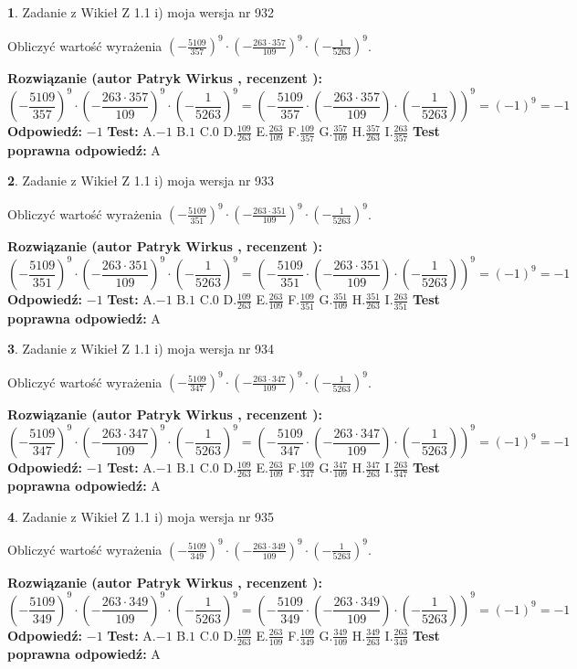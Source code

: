 \documentclass[12pt, a4paper]{article}
\theoremstyle{definition} %
\newtheorem{zad}{}
\newcommand{\zadStart}[1]{\begin{zad}#1\newline}
\newcommand{\zadStop}{\end{zad}}
\newcommand{\rozwStart}[2]{\noindent \textbf{Rozwiązanie (autor #1 , recenzent #2): }\newline}
\newcommand{\rozwStop}{\newline}
\newcommand{\odpStart}{\noindent \textbf{Odpowiedź:}\newline}
\newcommand{\odpStop}{\newline}
\newcommand{\testStart}{\noindent \textbf{Test:}\newline}
\newcommand{\testStop}{\newline}
\newcommand{\kluczStart}{\noindent \textbf{Test poprawna odpowiedź:}\newline}
\newcommand{\kluczStop}{\newline}
\begin{document}
\zadStart{Zadanie z Wikieł Z 1.1 i) moja wersja nr 932}

Obliczyć wartość wyrażenia $(-\frac{5109}{357})^{9} \cdot (-\frac{263 \cdot 357}{109})^{9} \cdot (-\frac{1}{5263})^{9}$.
\zadStop
\rozwStart{Patryk Wirkus}{}
$$(-\frac{5109}{357})^{9} \cdot (-\frac{263 \cdot 357}{109})^{9} \cdot (-\frac{1}{5263})^{9} = (-\frac{5109}{357} \cdot (-\frac{263 \cdot 357}{109}) \cdot (-\frac{1}{5263}))^{9} = (-1)^{9} = -1$$
\rozwStop
\odpStart
$-1$
\odpStop
\testStart
A.$-1$ B.$1$ C.$0$ D.$\frac{109}{263}$ E.$\frac{263}{109}$
F.$\frac{109}{357}$ G.$\frac{357}{109}$
H.$\frac{357}{263}$
I.$\frac{263}{357}$
\testStop
\kluczStart
A
\kluczStop



\zadStart{Zadanie z Wikieł Z 1.1 i) moja wersja nr 933}

Obliczyć wartość wyrażenia $(-\frac{5109}{351})^{9} \cdot (-\frac{263 \cdot 351}{109})^{9} \cdot (-\frac{1}{5263})^{9}$.
\zadStop
\rozwStart{Patryk Wirkus}{}
$$(-\frac{5109}{351})^{9} \cdot (-\frac{263 \cdot 351}{109})^{9} \cdot (-\frac{1}{5263})^{9} = (-\frac{5109}{351} \cdot (-\frac{263 \cdot 351}{109}) \cdot (-\frac{1}{5263}))^{9} = (-1)^{9} = -1$$
\rozwStop
\odpStart
$-1$
\odpStop
\testStart
A.$-1$ B.$1$ C.$0$ D.$\frac{109}{263}$ E.$\frac{263}{109}$
F.$\frac{109}{351}$ G.$\frac{351}{109}$
H.$\frac{351}{263}$
I.$\frac{263}{351}$
\testStop
\kluczStart
A
\kluczStop



\zadStart{Zadanie z Wikieł Z 1.1 i) moja wersja nr 934}

Obliczyć wartość wyrażenia $(-\frac{5109}{347})^{9} \cdot (-\frac{263 \cdot 347}{109})^{9} \cdot (-\frac{1}{5263})^{9}$.
\zadStop
\rozwStart{Patryk Wirkus}{}
$$(-\frac{5109}{347})^{9} \cdot (-\frac{263 \cdot 347}{109})^{9} \cdot (-\frac{1}{5263})^{9} = (-\frac{5109}{347} \cdot (-\frac{263 \cdot 347}{109}) \cdot (-\frac{1}{5263}))^{9} = (-1)^{9} = -1$$
\rozwStop
\odpStart
$-1$
\odpStop
\testStart
A.$-1$ B.$1$ C.$0$ D.$\frac{109}{263}$ E.$\frac{263}{109}$
F.$\frac{109}{347}$ G.$\frac{347}{109}$
H.$\frac{347}{263}$
I.$\frac{263}{347}$
\testStop
\kluczStart
A
\kluczStop



\zadStart{Zadanie z Wikieł Z 1.1 i) moja wersja nr 935}

Obliczyć wartość wyrażenia $(-\frac{5109}{349})^{9} \cdot (-\frac{263 \cdot 349}{109})^{9} \cdot (-\frac{1}{5263})^{9}$.
\zadStop
\rozwStart{Patryk Wirkus}{}
$$(-\frac{5109}{349})^{9} \cdot (-\frac{263 \cdot 349}{109})^{9} \cdot (-\frac{1}{5263})^{9} = (-\frac{5109}{349} \cdot (-\frac{263 \cdot 349}{109}) \cdot (-\frac{1}{5263}))^{9} = (-1)^{9} = -1$$
\rozwStop
\odpStart
$-1$
\odpStop
\testStart
A.$-1$ B.$1$ C.$0$ D.$\frac{109}{263}$ E.$\frac{263}{109}$
F.$\frac{109}{349}$ G.$\frac{349}{109}$
H.$\frac{349}{263}$
I.$\frac{263}{349}$
\testStop
\kluczStart
A
\kluczStop
\end{document}
